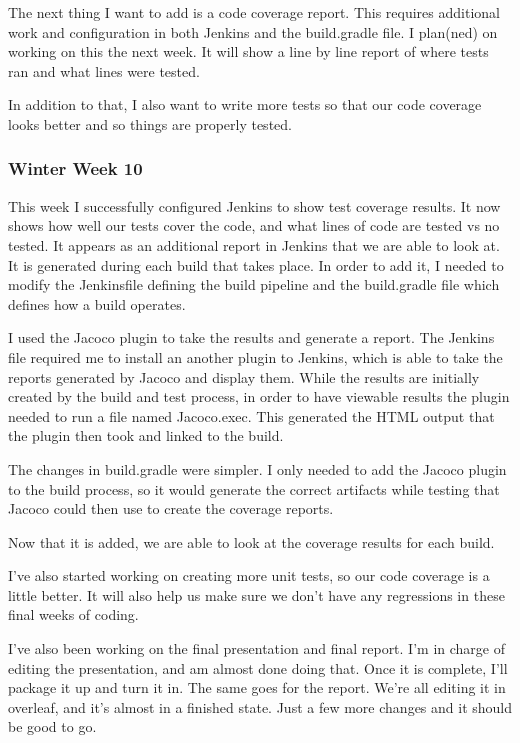 \documentclass[onecolumn, draftclsnofoot,10pt, compsoc]{IEEEtran}
\begin{document}
The next thing I want to add is a code coverage report.  
This requires additional work and configuration in both Jenkins and the build.gradle file.  
I plan(ned) on working on this the next week.
It will show a line by line report of where tests ran and what lines were tested.

In addition to that, I also want to write more tests so that our code coverage looks better and so things are properly tested.

\subsubsection*{Winter Week 10}
This week I successfully configured Jenkins to show test coverage results.  
It now shows how well our tests cover the code, and what lines of code are tested vs no tested.  
It appears as an additional report in Jenkins that we are able to look at.  
It is generated during each build that takes place.  
In order to add it, I needed to modify the Jenkinsfile defining the build pipeline and the build.gradle file which defines how a build operates. 

I used the Jacoco plugin to take the results and generate a report.  
The Jenkins file required me to install an another plugin to Jenkins, which is able to take the reports generated by Jacoco and display them. 
While the results are initially created by the build and test process, in order to have viewable results the plugin needed to run a file named Jacoco.exec.  This generated the HTML output that the plugin then took and linked to the build. 

The changes in build.gradle were simpler.  
I only needed to add the Jacoco plugin to the build process, so it would generate the correct artifacts while testing that Jacoco could then use to create the coverage reports.

Now that it is added, we are able to look at the coverage results for each build. 

I've also started working on creating more unit tests, so our code coverage is a little better.  
It will also help us make sure we don't have any regressions in these final weeks of coding.

I've also been working on the final presentation and final report.  
I'm in charge of editing the presentation, and am almost done doing that.  
Once it is complete, I'll package it up and turn it in.  
The same goes for the report.  
We're all editing it in overleaf, and it's almost in a finished state.  
Just a few more changes and it should be good to go.
\end{document}
